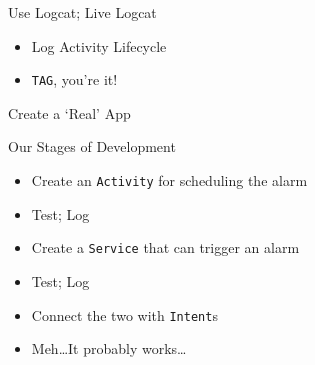 \documentclass[a4paper,slides=slides,handouts=handouts]{mh-presentation}       %
\begin{document}
	\begin{slide}
		{\Huge Use Logcat; Live Logcat}
		
		\vspace{5mm}
		
		\huge
		\begin{minipage}{7cm}
			\begin{itemize}
			  \item Log Activity Lifecycle
			  \item \verb~TAG~, you're it!
			\end{itemize}
		\end{minipage}
	\end{slide}
	
	\begin{slide}
		{\Huge Create a `Real' App}
	\end{slide}
	
	\begin{slide}
		{\Huge Our Stages of Development}
		
		\vspace{5mm}
		
		\Large
		\begin{minipage}{11cm}
			\begin{itemize}
			  \item Create an \verb~Activity~ for scheduling the alarm \pause
			  \item Test; Log \pause
			  \item Create a \verb~Service~ that can trigger an alarm \pause
			  \item Test; Log \pause
			  \item Connect the two with \verb~Intent~s \pause
			  \item Meh\ldots It probably works\ldots
			\end{itemize}
		\end{minipage}
	\end{slide}
	
	
	\showPreviousPreviousSlide\showPreviousSlide\showThisSlide[6]
	\vspace{4mm}
	
\end{document}
